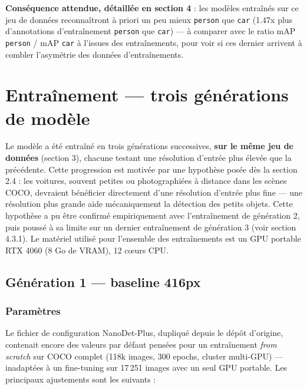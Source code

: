\documentclass[11pt,a4paper]{article}
\let\Oldsubsection\subsection
\renewcommand{\subsection}{\FloatBarrier\Oldsubsection}
\let\Oldsubsubsection\subsubsection
\renewcommand{\subsubsection}{\FloatBarrier\Oldsubsubsection}
\begin{document}
    \textbf{Conséquence attendue, détaillée en section 4} : les modèles
    entraînés sur ce jeu de données reconnaîtront à priori un peu mieux
    \texttt{person} que \texttt{car} (1.47x plus d'annotations d’entraînement \texttt{person} que \texttt{car}) --- à comparer avec le ratio mAP \texttt{person} / mAP \texttt{car} à l'issues des entraînements, pour voir si ces dernier arrivent à combler l’asymétrie des données d’entraînements.
    
    
    \section{Entraînement --- trois générations de modèle}
    
    Le modèle a été entraîné en trois générations successives, \textbf{sur
    le même jeu de données} (section 3), chacune testant une résolution
    d'entrée plus élevée que la précédente. Cette progression est motivée
    par une hypothèse posée dès la section 2.4 : les voitures, souvent
    petites ou photographiées à distance dans les scènes COCO,
    devraient bénéficier directement d'une résolution d'entrée plus fine
    --- une résolution plus grande aide mécaniquement la détection des
    petits objets. Cette hypothèse a pu être confirmé empiriquement avec l’entraînement de génération 2, puis poussé à sa limite sur un dernier entraînement de génération 3 (voir section 4.3.1). Le matériel utilisé pour l'ensemble des
    entraînements est un GPU portable RTX 4060 (8 Go de VRAM), 12 cœurs
    CPU.
    
    \subsection{Génération 1 --- baseline 416px}
    
    \subsubsection{Paramètres}
    
    Le fichier de configuration NanoDet-Plus, dupliqué depuis le dépôt
    d'origine, contenait encore des valeurs par défaut pensées pour un
    entraînement \emph{from scratch} sur COCO complet (118k images, 300
    epochs, cluster multi-GPU) --- inadaptées à un fine-tuning sur
    17\,251 images avec un seul GPU portable. Les principaux ajustements sont les suivants :
    
\end{document}
